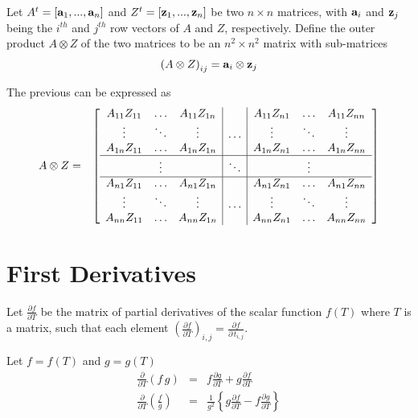 \documentclass{report}
\begin{document}
\noindent Let $A^t = [{\bf a}_1,...,{\bf a}_n]$ and 
$Z^t = [{\bf z}_1,...,{\bf z}_n]$ be two $n \times n$ matrices,
with ${\bf a}_i$ and ${\bf z}_j$ being the $i^{th}$ and $j^{th}$ 
row vectors of $A$ and $Z$, respectively. Define the 
outer product $A \otimes Z$ of the two matrices to be an $n^2 \times n^2$ 
matrix with sub-matrices
\begin{eqnarray}
\label{matrixouter}
\left( A \otimes Z \right)_{ij} = {\bf a}_i \otimes {\bf z}_j
\end{eqnarray}

\noindent The previous can be expressed as
\begin{eqnarray}
A \otimes Z & = &
\left[ \begin{array}{ccc|c|ccc}
A_{11} Z_{11} &
\ldots &
A_{11} Z_{1n} &
&
A_{11} Z_{n1} &
\ldots &
A_{11} Z_{nn} \\
\vdots & \ddots & \vdots &
\ldots &
\vdots & \ddots & \vdots \\
A_{1n} Z_{11} &
\ldots &
A_{1n} Z_{1n} &
&
A_{1n} Z_{n1} &
\ldots &
A_{1n} Z_{nn} \\
\hline
& \vdots & & \ddots & & \vdots \\
\hline
A_{n1} Z_{11} &
\ldots &
A_{n1} Z_{1n} &
&
A_{n1} Z_{n1} &
\ldots &
A_{n1} Z_{nn} \\
\vdots & \ddots & \vdots &
\ldots &
\vdots & \ddots & \vdots \\
A_{nn} Z_{11} &
\ldots &
A_{nn} Z_{1n} &
&
A_{nn} Z_{n1} &
\ldots &
A_{nn} Z_{nn} 
\end{array} \right] \nonumber \label{matrix-outer} \\
\end{eqnarray}

\section{First Derivatives}

Let $\frac{\partial f}{\partial T}$ be the matrix of partial derivatives of the scalar function $f(T)$ where $T$ is a matrix, such that each element 
$\left(\frac{\partial f}{\partial T}\right)_{i,j} = \frac{\partial f}{\partial \, t_{i,j}}$.

\noindent Let $f=f(T)$ and $g=g(T)$
\begin{eqnarray}
\frac{\partial}{\partial T} \left( f \, g \right) & = & f \frac{\partial g}{\partial T} + g \frac{\partial f}{\partial T} \label{prod1} \\
\frac{\partial}{\partial T} \left( \frac{f}{g} \right) & = & \frac{1}{g^2} \left\{ g \frac{\partial f}{\partial T} - f \frac{\partial g}{\partial T} \right\} \label{quotient1}
\end{eqnarray}
\end{document}
